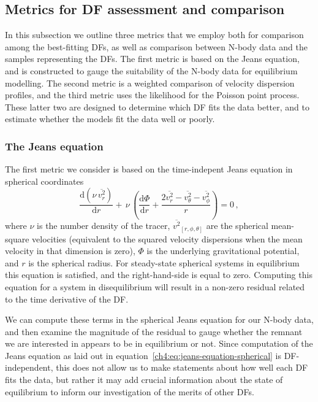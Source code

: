 \subsection{Metrics for DF assessment and comparison}

In this subsection we outline three metrics that we employ both for comparison among the best-fitting DFs, as well as comparison between N-body data and the samples representing the DFs. The first metric is based on the Jeans equation, and is constructed to gauge the suitability of the N-body data for equilibrium modelling. The second metric is a weighted comparison of velocity dispersion profiles, and the third metric uses the likelihood for the Poisson point process. These latter two are designed to determine which DF fits the data better, and to estimate whether the models fit the data well or poorly.

\subsubsection{The Jeans equation}
\label{ch4:subsubsec:jeans-equation}

The first metric we consider is based on the time-indepent Jeans equation in spherical coordinates
\begin{equation}
    \label{ch4:eq:jeans-equation-spherical}
    \frac{\mathrm{d} (\nu\,\overline{v^2_r})}{\mathrm{d} r} +\,\nu\,
    \left(\frac{\mathrm{d} \Phi}{\mathrm{d} r}+
    \frac{2\overline{v_r^2}-\overline{v_\theta^2}-\overline{v_\phi^2}}{r}\right) = 0\,,
\end{equation}
where $\nu$ is the number density of the tracer, $\overline{v^{2}}_{[r,\phi,\theta]}$ are the spherical mean-square velocities (equivalent to the squared velocity dispersions when the mean velocity in that dimension is zero), $\Phi$ is the underlying gravitational potential, and $r$ is the spherical radius. For steady-state spherical systems in equilibrium this equation is satisfied, and the right-hand-side is equal to zero. Computing this equation for a system in disequilibrium will result in a non-zero residual related to the time derivative of the DF. 

We can compute these terms in the spherical Jeans equation for our N-body data, and then examine the magnitude of the residual to gauge whether the remnant we are interested in appears to be in equilibrium or not. Since computation of the Jeans equation as laid out in equation~\eqref{ch4:eq:jeans-equation-spherical} is DF-independent, this does not allow us to make statements about how well each DF fits the data, but rather it may add crucial information about the state of equilibrium to inform our investigation of the merits of other DFs.

